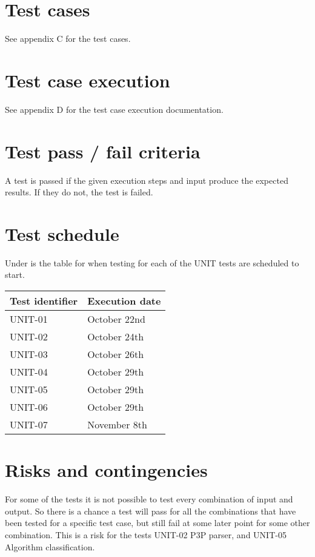 	\section{Test cases}
		See appendix C for the test cases.

	\section{Test case execution}
		See appendix D for the test case execution documentation.

	\section{Test pass / fail criteria}
		A test is passed if the given execution steps and input produce the expected results. If they do not, the test is failed.

	\section {Test schedule}
		Under is the table for when testing for each of the UNIT tests are scheduled to start.

		\begin{center}
			\begin{tabular}{ |  p{5cm} | p{5cm} | }
				\hline
				Test identifier & Execution date \\ [3pt] \hline \hline
				UNIT-01 & October 22nd \\  [3pt] \hline
				UNIT-02 & October 24th \\  [3pt] \hline
				UNIT-03 & October 26th \\  [3pt] \hline
				UNIT-04 & October 29th \\  [3pt] \hline
				UNIT-05 & October 29th \\  [3pt] \hline
				UNIT-06 & October 29th \\  [3pt] \hline
				UNIT-07 & November 8th \\  [3pt] \hline
			\end{tabular}
		\end{center}

\section{Risks and contingencies}
For some of the tests it is not possible to test every combination of input and output. So there is a chance a test will pass for all the combinations that have been tested for a specific test case, but still fail at some later point for some other combination. This is a risk for the tests UNIT-02 P3P parser, and UNIT-05 Algorithm classification.

